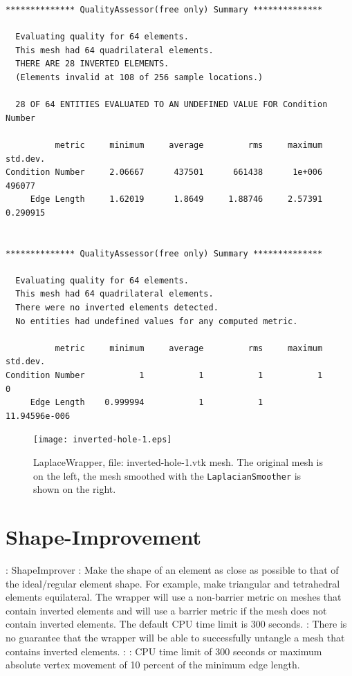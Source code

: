 \begin{verbatim}
************** QualityAssessor(free only) Summary **************

  Evaluating quality for 64 elements.
  This mesh had 64 quadrilateral elements.
  THERE ARE 28 INVERTED ELEMENTS.
  (Elements invalid at 108 of 256 sample locations.)

  28 OF 64 ENTITIES EVALUATED TO AN UNDEFINED VALUE FOR Condition Number

          metric     minimum     average         rms     maximum    std.dev.
Condition Number     2.06667      437501      661438      1e+006      496077
     Edge Length     1.62019      1.8649     1.88746     2.57391    0.290915


************** QualityAssessor(free only) Summary **************

  Evaluating quality for 64 elements.
  This mesh had 64 quadrilateral elements.
  There were no inverted elements detected.
  No entities had undefined values for any computed metric.

          metric     minimum     average         rms     maximum    std.dev.
Condition Number           1           1           1           1           0
     Edge Length    0.999994           1           1           11.94596e-006
\end{verbatim}
\begin{figure}[htbp]
\begin{center}
    \texttt{[image: inverted-hole-1.eps]}
    \caption{LaplaceWrapper, file: inverted-hole-1.vtk mesh. The original mesh is on the left, the mesh smoothed with the \texttt{LaplacianSmoother} is shown on the right.}
    \label{fig:inverted_hole_1}
\end{center}
\end{figure}

\newpage

\section{Shape-Improvement} \label{sec:ShapeImprover}

: ShapeImprover \newline
{}: Make the shape of an element as close as possible to 
that of the ideal/regular element shape. For example, make triangular and 
tetrahedral elements equilateral.  The wrapper will use a non-barrier metric on meshes that contain inverted elements
and will use a barrier metric if the mesh does not contain inverted elements.  The default CPU time limit is 300 seconds.\newline 
{}: There is no guarantee that the wrapper will be able to successfully untangle a mesh that contains inverted elements.\newline
{}:  \newline 
{}: CPU time limit of 300 seconds or maximum absolute vertex movement of 10 percent of the minimum edge length. \newline \newline

